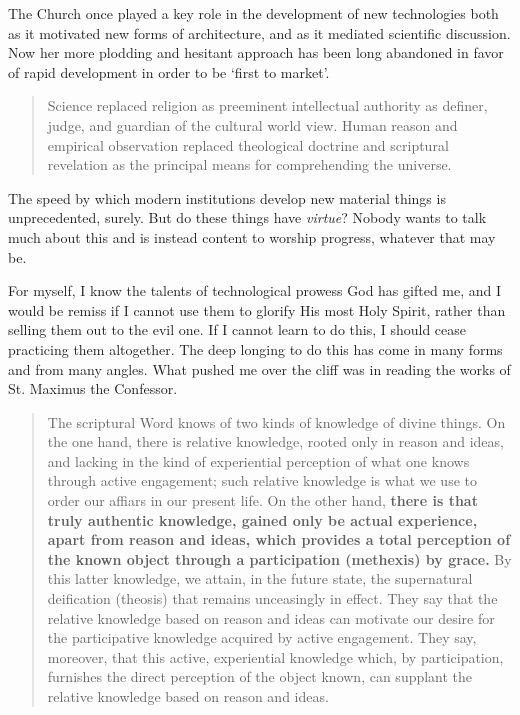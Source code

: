 \documentclass[letterpaper]{article}
\begin{document}
The Church once played a key role in the development of new technologies both as it motivated new forms of architecture, and as it mediated scientific discussion. Now her more plodding and hesitant approach has been long abandoned in favor of rapid development in order to be `first to market'.

\begin{quote}
  Science replaced religion as preeminent intellectual authority as definer, judge, and guardian of the cultural world view. Human reason and empirical observation replaced theological doctrine and scriptural revelation as the principal means for comprehending the universe.
\end{quote}

The speed by which modern institutions develop new material things is unprecedented, surely. But do these things have \textit{virtue}? Nobody wants to talk much about this and is instead content to worship progress, whatever that may be.

For myself, I know the talents of technological prowess God has gifted me, and I would be remiss if I cannot use them to glorify His most Holy Spirit, rather than selling them out to the evil one. If I cannot learn to do this, I should cease practicing them altogether. The deep longing to do this has come in many forms and from many angles. What pushed me over the cliff was in reading the works of St. Maximus the Confessor.

\begin{quote}
  The scriptural Word knows of two kinds of knowledge of divine things. On the one hand, there is relative knowledge, rooted only in reason and ideas, and lacking in the kind of experiential perception of what one knows through active engagement; such relative knowledge is what we use to order our affiars in our present life. On the other hand, \textbf{there is that truly authentic knowledge, gained only be actual experience, apart from reason and ideas, which provides a total perception of the known object through a participation (methexis) by grace.} By this latter knowledge, we attain, in the future state, the supernatural deification (theosis) that remains unceasingly in effect. They say that the relative knowledge based on reason and ideas can motivate our desire for the participative knowledge acquired by active engagement. They say, moreover, that this active, experiential knowledge which, by participation, furnishes the direct perception of the object known, can supplant the relative knowledge based on reason and ideas.
\end{quote}
\end{document}
